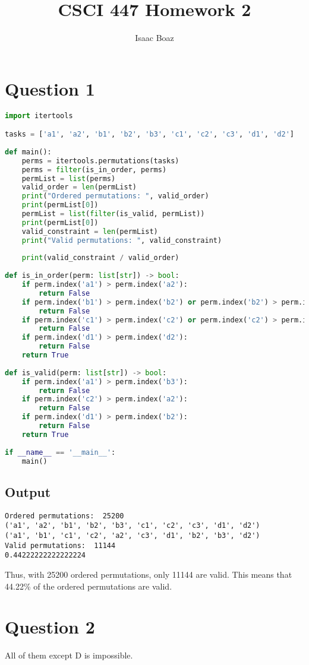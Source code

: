 \documentclass{article}
\title{CSCI 447 Homework 2}
\author{Isaac Boaz}
\begin{document}
\section*{Question 1}

\begin{lstlisting}[language=Python, showstringspaces=false]
import itertools

tasks = ['a1', 'a2', 'b1', 'b2', 'b3', 'c1', 'c2', 'c3', 'd1', 'd2']
    
def main():
    perms = itertools.permutations(tasks)
    perms = filter(is_in_order, perms)
    permList = list(perms)
    valid_order = len(permList)
    print("Ordered permutations: ", valid_order)
    print(permList[0]) 
    permList = list(filter(is_valid, permList))
    print(permList[0]) 
    valid_constraint = len(permList)
    print("Valid permutations: ", valid_constraint)
    
    print(valid_constraint / valid_order)
    
def is_in_order(perm: list[str]) -> bool:
    if perm.index('a1') > perm.index('a2'):
        return False
    if perm.index('b1') > perm.index('b2') or perm.index('b2') > perm.index('b3'):
        return False
    if perm.index('c1') > perm.index('c2') or perm.index('c2') > perm.index('c3'):
        return False
    if perm.index('d1') > perm.index('d2'):
        return False
    return True
    
def is_valid(perm: list[str]) -> bool:
    if perm.index('a1') > perm.index('b3'):
        return False
    if perm.index('c2') > perm.index('a2'):
        return False
    if perm.index('d1') > perm.index('b2'):
        return False
    return True
    
if __name__ == '__main__':
    main()
    \end{lstlisting}

\subsection*{Output}
\begin{verbatim}
Ordered permutations:  25200
('a1', 'a2', 'b1', 'b2', 'b3', 'c1', 'c2', 'c3', 'd1', 'd2')
('a1', 'b1', 'c1', 'c2', 'a2', 'c3', 'd1', 'b2', 'b3', 'd2')
Valid permutations:  11144
0.44222222222222224
\end{verbatim}

Thus, with 25200 ordered permutations, only 11144 are valid. This means that 44.22\% of the ordered permutations are valid.

\section*{Question 2}
All of them except D is impossible.
\end{document}
